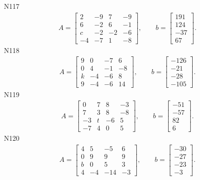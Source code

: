 \documentclass[11pt]{report}
\begin{document}
N117
\begin{align*}
 A = \left[\begin{matrix}2 & -9 & 7 & -9\\6 & -2 & 6 & -1\\c & -2 & -2 & -6\\-4 & -7 & 1 & -8\end{matrix}\right],
\qquad b = \left[\begin{matrix}191\\124\\-37\\67\end{matrix}\right]. 
 \end{align*}
N118
\begin{align*}
 A = \left[\begin{matrix}9 & 0 & -7 & 6\\0 & 4 & -1 & -8\\k & -4 & -6 & 8\\9 & -4 & -6 & 14\end{matrix}\right],
\qquad b = \left[\begin{matrix}-126\\-21\\-28\\-105\end{matrix}\right]. 
 \end{align*}
N119
\begin{align*}
 A = \left[\begin{matrix}0 & 7 & 8 & -3\\7 & 3 & 8 & -8\\-3 & t & -6 & 5\\-7 & 4 & 0 & 5\end{matrix}\right],
\qquad b = \left[\begin{matrix}-51\\-57\\82\\6\end{matrix}\right]. 
 \end{align*}
N120
\begin{align*}
 A = \left[\begin{matrix}4 & 5 & -5 & 6\\0 & 9 & 9 & 9\\b & 0 & 5 & 3\\4 & -4 & -14 & -3\end{matrix}\right],
\qquad b = \left[\begin{matrix}-30\\-27\\-23\\-3\end{matrix}\right]. 
 \end{align*}
\end{document}
